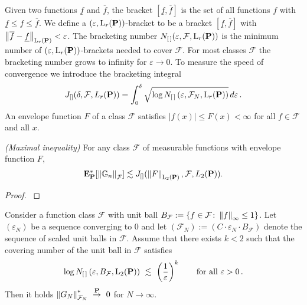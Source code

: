 Given two functions $\underline{f}$ and $\overline{f}$, the bracket
$[\underline{f},\overline{f}]$ 
is the set of all functions $f$ with 
$\underline{f}\le f \le \overline{f}$.
We define a
$(\varepsilon,\mathrm{L}_{r}(\P))$-bracket
to be a bracket
$[\underline{f},\overline{f}]$ with
$\norm{\overline{f}-\underline{f}}_{\mathrm{L}_r(\P)}< \varepsilon$.
The bracketing number 
$
N_{[\,]}(\varepsilon, \mathcal{F},\mathrm{L}_r(\P))
$
is 
the minimum number of 
$(\varepsilon,\mathrm{L}_{r}(\P))$-brackets needed to cover $\mathcal{F}$.
For most classes $\mathcal{F}$ the bracketing number grows to infinity for $\varepsilon\to 0$.
To measure the speed of convergence we introduce the bracketing integral
\begin{gather}
     J
    _{[]}
    (
    \delta
    ,
    \mathcal{F}
    ,
    L_r(\P)
    )
    =
  \int_0^{\delta}
      \sqrt{
        \log 
      N_{[\,]}
\left( \varepsilon, \mathcal{F}_N,\mathrm{L}_r(\P) \right)
    }
    \,
    d\varepsilon
    \,.
\end{gather}
An envelope function $F$ of a class $\mathcal{F}$ satisfies 
$|f(x)|\le F(x)< \infty$ for all $f\in\mathcal{F}$ and all $x$.
\begin{theorem}
  \emph{(Maximal inequality)}
  For any class $\mathcal{F}$ of measurable functions with envelope function $F,$
  \begin{gather}
    \E^*
    _\P
    [
    \norm{
      \G
      _n
      }
      _\mathcal{F}
    ]
    \lesssim
    J
    _{[]}
    (
    \norm{
      F
    }
    _{\mathrm{L}_2(\P)}
    ,
    \mathcal{F}
    ,
    L_2(\P)
    )
    .
  \end{gather}
\end{theorem}
\begin{proof}
  \cite[Corollary~19.35]{Vaart2000}
\end{proof}
\begin{lemma}
  \label{lemma_max_ineq}
  Consider a function class $\mathcal{F}$ with unit ball
  $
  B_{\mathcal{F}}
  :=
  \left\{ 
    f\in \mathcal{F}
    \colon
    \norm{f}_\infty
    \le
    1
  \right\}
  $.
  Let $(\varepsilon_N)$ be a sequence converging to 0
  and let 
  $
  \left( 
    \mathcal{F}_N
  \right)
    :=
    \left( 
      C\cdot
    \varepsilon_N\cdot B_\mathcal{F}
    \right)
  $
  denote the sequence of scaled unit balls in $\mathcal{F}$.
  Assume that 
  there exists
  $k<2$ such that 
  the covering number of the unit ball in $\mathcal{F}$
  satisfies
  \begin{gather}
        \log 
      N_{[\,]}
\left( \varepsilon, B_\mathcal{F},\mathrm{L}_2(\P) \right)
\ 
\lesssim
\ 
\left( \frac{1}{\varepsilon} \right)^k
\qquad
\text{for all}\ 
\varepsilon>0
\,.
  \end{gather}
  Then it holds
  $
      \norm{G_N}^*_{\mathcal{F}_N}
    \ 
    \overset{\P}
    {\to}
    \ 
    0
  $
  for $N\to \infty$. 
\end{lemma}
